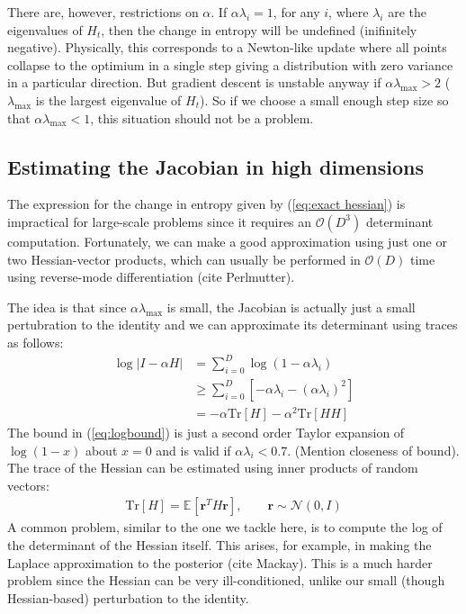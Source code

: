 \documentclass[]{article}
\newcommand{\vr}{\mathbf{r}}
\newcommand{\expectargs}[2]{\mathbb{E}_{#1} \left[ {#2} \right]}
\newcommand{\N}[2]{\mathcal{N}\!\left(#1,#2\right)}
\newcommand{\stepsize}{\alpha}
\newcommand{\bigo}[1]{\mathcal{O}\left(#1\right)}
\newcommand{\trace}[1]{\text{Tr}\left[#1\right]}
\begin{document}
There are, however, restrictions on $\stepsize$. If $\stepsize\lambda_i = 1$,
for any $i$, where $\lambda_i$ are the eigenvalues of $H_t$, then the change in
entropy will be undefined (inifinitely negative). Physically, this corresponds
to a Newton-like update where all points collapse to the optimium in a single
step giving a distribution with zero variance in a particular direction. But
gradient descent is unstable anyway if $\stepsize\lambda_{\text{max}} > 2$
($\lambda_{\text{max}}$ is the largest eigenvalue of $H_t$). So if we
choose a small enough step size so that $\stepsize\lambda_{\text{max}} < 1$,
this situation should not be a problem.

\subsection{Estimating the Jacobian in high dimensions}

The expression for the change in entropy given by (\ref{eq:exact hessian}) is
impractical for large-scale problems since it requires an $\bigo{D^3}$
determinant computation. Fortunately, we can make a good approximation using
just one or two Hessian-vector products, which can usually be performed in
$\bigo{D}$ time using reverse-mode differentiation (cite Perlmutter).

The idea is that since $\stepsize\lambda_{\text{max}}$ is small, the Jacobian is
actually just a small pertubration to the identity and we can approximate its
determinant using traces as follows:
\begin{align}
\log \left| I - \stepsize H \right|
& =    \sum_{i=0}^D \log\left(1 - \stepsize\lambda_i\right) \nonumber \\
& \geq \sum_{i=0}^D \left[- \stepsize\lambda_i 
                        - (\stepsize\lambda_i)^2 \right] \label{eq:logbound} \\
& = - \stepsize \trace{H} - \stepsize^2 \trace{HH}
\end{align}
The bound in (\ref{eq:logbound}) is just a second order Taylor expansion of
$\log(1 - x)$ about $x = 0$ and is valid if $\stepsize\lambda_i < 0.7$.
(Mention closeness of bound). The trace of the Hessian can be estimated using
inner products of random vectors:
\begin{align}
\trace{H} = \expectargs{}{\vr^TH\vr}, \qquad \vr \sim \N{0}{I}
\label{eq:approx-log-det}
\end{align}
A common problem, similar to the one we tackle here, is to compute the log of
the determinant of the Hessian itself. This arises, for example, in making the
Laplace approximation to the posterior (cite Mackay). This is a much harder
problem since the Hessian can be very ill-conditioned, unlike our small
(though Hessian-based) perturbation to the identity.
\end{document}
